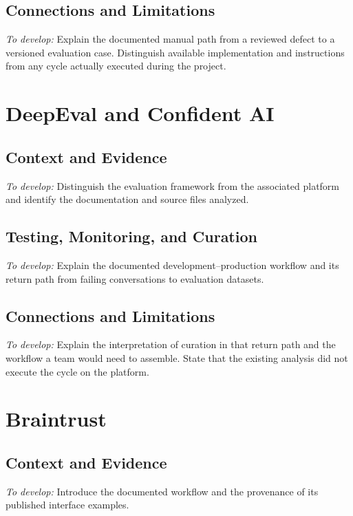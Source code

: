 \subsection{Connections and Limitations}
\noindent\emph{To develop:} Explain the documented manual path from a reviewed
defect to a versioned evaluation case. Distinguish available implementation
and instructions from any cycle actually executed during the project.

\section{DeepEval and Confident AI}
\label{sec:case-deepeval}

\subsection{Context and Evidence}
\noindent\emph{To develop:} Distinguish the evaluation framework from the
associated platform and identify the documentation and source files analyzed.

\subsection{Testing, Monitoring, and Curation}
\noindent\emph{To develop:} Explain the documented development--production
workflow and its return path from failing conversations to evaluation datasets.

\subsection{Connections and Limitations}
\noindent\emph{To develop:} Explain the interpretation of curation in that
return path and the workflow a team would need to assemble. State that the
existing analysis did not execute the cycle on the platform.

\section{Braintrust}
\label{sec:case-braintrust}

\subsection{Context and Evidence}
\noindent\emph{To develop:} Introduce the documented workflow and the provenance
of its published interface examples.

